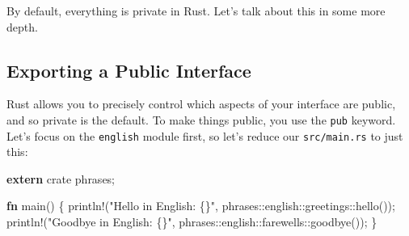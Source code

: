 \documentclass[a4paper,]{book}
\newenvironment{Shaded}{\begin{snugshade}}{\end{snugshade}}
\newcommand{\KeywordTok}[1]{\textcolor[rgb]{0.13,0.29,0.53}{\textbf{{#1}}}}
\newcommand{\StringTok}[1]{\textcolor[rgb]{0.31,0.60,0.02}{{#1}}}
\newcommand{\OtherTok}[1]{\textcolor[rgb]{0.56,0.35,0.01}{{#1}}}
\newcommand{\NormalTok}[1]{{#1}}
\begin{document}
\begin{Shaded}
\end{Shaded}

By default, everything is private in Rust. Let's talk about this in some
more depth.

\subsection{Exporting a Public
Interface}\label{exporting-a-public-interface}

Rust allows you to precisely control which aspects of your interface are
public, and so private is the default. To make things public, you use
the \texttt{pub} keyword. Let's focus on the \texttt{english} module
first, so let's reduce our \texttt{src/main.rs} to just this:

\begin{Shaded}
\begin{Highlighting}[]
\KeywordTok{extern} \NormalTok{crate phrases;}

\KeywordTok{fn} \NormalTok{main() \{}
    \OtherTok{println!}\NormalTok{(}\StringTok{"Hello in English: \{\}"}\NormalTok{, phrases::english::greetings::hello());}
    \OtherTok{println!}\NormalTok{(}\StringTok{"Goodbye in English: \{\}"}\NormalTok{, phrases::english::farewells::goodbye());}
\NormalTok{\}}
\end{Highlighting}
\end{Shaded}
\end{document}
